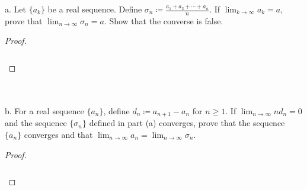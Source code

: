 a.  Let $\{a_k\}$ be a real sequence. Define
    $\sigma_n \coloneqq \frac{a_1 + a_2 + \cdots + a_n}{n}$. If 
    $\lim_{k \rightarrow \infty}{a_k} = a$, prove that
     $\lim_{n \rightarrow \infty}{\sigma_n} = a$.  Show that the converse is
    false.

    \begin{proof}\ \\\\
    
        \begin{align*}
        \end{align*}
    \end{proof}
    \ \\\\

b.  For a real sequence $\{a_n\}$, define $d_n \coloneqq a_{n+1} - a_n$ for
    $n \ge 1$. If $\lim_{n \rightarrow \infty}{nd_n} = 0$ and the sequence
    $\{\sigma_n\}$ defined in part (a) converges, prove that the sequence
    $\{a_n\}$ converges and that
    $\lim_{n \rightarrow \infty}{a_n} = \lim_{n \rightarrow \infty}{\sigma_n}$.

    \begin{proof}\ \\\\

        \begin{align*}
        \end{align*}

    \end{proof}